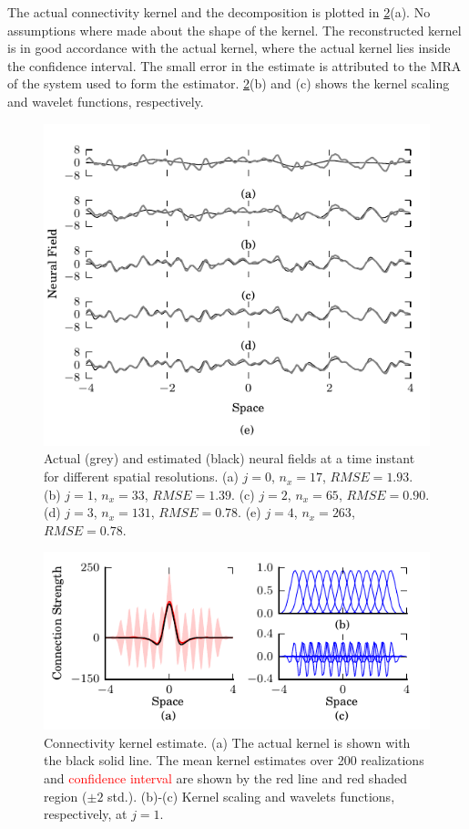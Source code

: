 \documentclass[journal]{IEEEtran}
\newcommand{\mike}[1]{\textcolor{red}{#1}}
\begin{document}
The actual connectivity kernel and the decomposition is plotted in \figurename{\ref{fig:KernelEstimate}}(a). No assumptions where made about the shape of the kernel. The reconstructed kernel is in good accordance with the actual kernel, where the actual kernel lies inside the confidence interval. The small error in the estimate is attributed to the MRA of the system used to form the estimator. \figurename{\ref{fig:KernelEstimate}}(b) and (c) shows the kernel scaling and wavelet functions, respectively.
\begin{figure}[!h] 
	\centering
		\includegraphics[scale=1]{./Graph/fig1.pdf}
		\caption{Actual (grey) and estimated (black) neural fields at a time instant for different spatial resolutions. (a) $j=0$, $n_x=17$, $RMSE = 1.93$. (b) $j=1$, $n_x=33$, $RMSE = 1.39$. (c) $j=2$, $n_x=65$, $RMSE = 0.90$. (d) $j=3$, $n_x=131$, $RMSE = 0.78$. (e) $j=4$, $n_x=263$, $RMSE=0.78$.}
	\label{fig:FieldEstimates}
\end{figure} 
\begin{figure}[!h] 
	\centering
		\includegraphics[scale=1]{./Graph/fig2.pdf}
		\caption{Connectivity kernel estimate. (a) The actual kernel is shown with the black solid line. The mean kernel estimates over 200 realizations and \mike{confidence interval} are shown by the red line and red shaded region ($\pm2$ std.). (b)-(c) Kernel scaling and wavelets functions, respectively, at $j=1$.}
	\label{fig:KernelEstimate}
\end{figure}
\end{document}
